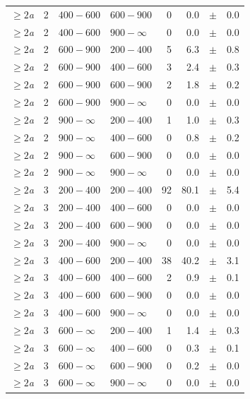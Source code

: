 \begin{table}[!h]
\begin{tabular}{rrllrrcl}
$\geq 2${\it a} & 2 & $ 400- 600$ & $600-900$ &      0 &      0.0 &$\pm$&    0.0 \\
$\geq 2${\it a} & 2 & $ 400- 600$ & $900-\infty$ &      0 &      0.0 &$\pm$&    0.0 \\
$\geq 2${\it a} & 2 & $ 600- 900$ & $200-400$ &      5 &      6.3 &$\pm$&    0.8 \\
$\geq 2${\it a} & 2 & $ 600- 900$ & $400-600$ &      3 &      2.4 &$\pm$&    0.3 \\
$\geq 2${\it a} & 2 & $ 600- 900$ & $600-900$ &      2 &      1.8 &$\pm$&    0.2 \\
$\geq 2${\it a} & 2 & $ 600- 900$ & $900-\infty$ &      0 &      0.0 &$\pm$&    0.0 \\
$\geq 2${\it a} & 2 & $ 900- \infty$ & $200-400$ &      1 &      1.0 &$\pm$&    0.3 \\
$\geq 2${\it a} & 2 & $ 900- \infty$ & $400-600$ &      0 &      0.8 &$\pm$&    0.2 \\
$\geq 2${\it a} & 2 & $ 900- \infty$ & $600-900$ &      0 &      0.0 &$\pm$&    0.0 \\
$\geq 2${\it a} & 2 & $ 900- \infty$ & $900-\infty$ &      0 &      0.0 &$\pm$&    0.0 \\
$\geq 2${\it a} & 3 & $ 200- 400$ & $200-400$ &     92 &     80.1 &$\pm$&    5.4 \\
$\geq 2${\it a} & 3 & $ 200- 400$ & $400-600$ &      0 &      0.0 &$\pm$&    0.0 \\
$\geq 2${\it a} & 3 & $ 200- 400$ & $600-900$ &      0 &      0.0 &$\pm$&    0.0 \\
$\geq 2${\it a} & 3 & $ 200- 400$ & $900-\infty$ &      0 &      0.0 &$\pm$&    0.0 \\
$\geq 2${\it a} & 3 & $ 400- 600$ & $200-400$ &     38 &     40.2 &$\pm$&    3.1 \\
$\geq 2${\it a} & 3 & $ 400- 600$ & $400-600$ &      2 &      0.9 &$\pm$&    0.1 \\
$\geq 2${\it a} & 3 & $ 400- 600$ & $600-900$ &      0 &      0.0 &$\pm$&    0.0 \\
$\geq 2${\it a} & 3 & $ 400- 600$ & $900-\infty$ &      0 &      0.0 &$\pm$&    0.0 \\
$\geq 2${\it a} & 3 & $ 600- \infty$ & $200-400$ &      1 &      1.4 &$\pm$&    0.3 \\
$\geq 2${\it a} & 3 & $ 600- \infty$ & $400-600$ &      0 &      0.3 &$\pm$&    0.1 \\
$\geq 2${\it a} & 3 & $ 600- \infty$ & $600-900$ &      0 &      0.2 &$\pm$&    0.0 \\
$\geq 2${\it a} & 3 & $ 600- \infty$ & $900-\infty$ &      0 &      0.0 &$\pm$&    0.0 \\
    \hline
  \end{tabular}
\end{table}

